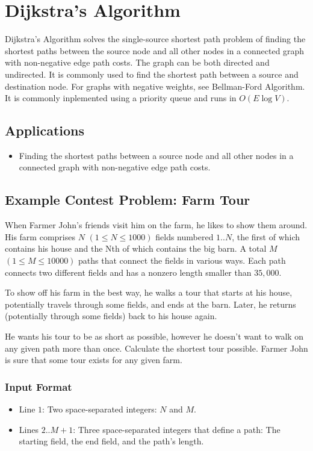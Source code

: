 \section{Dijkstra's Algorithm}
Dijkstra's Algorithm solves the single-source shortest path problem of finding the shortest paths between the source 
node and all other nodes in a connected graph with non-negative edge path costs.  
The graph can be both directed and undirected.  
It is commonly used to find the shortest path between a source and destination node.  
For graphs with negative weights, see Bellman-Ford Algorithm.
It is commonly inplemented using a priority queue and runs in $O(E \log V)$.

\subsection{Applications}

\begin{itemize}
	\item  Finding the shortest paths between a source node and all other nodes in a connected graph with non-negative edge path costs.
\end{itemize}

\subsection{Example Contest Problem: Farm Tour\cite{farmtour}}
When Farmer John's friends visit him on the farm, he likes to show them around. 
His farm comprises $N$ $(1 \leq N \leq 1000)$ fields numbered $1..N$, the first of which contains his house and the Nth of which contains the big barn. 
A total $M$ $(1 \leq M \leq 10000)$ paths that connect the fields in various ways. 
Each path connects two different fields and has a nonzero length smaller than $35,000$. 

To show off his farm in the best way, he walks a tour that starts at his house, potentially travels through some fields, and ends at the barn. 
Later, he returns (potentially through some fields) back to his house again. 

He wants his tour to be as short as possible, however he doesn't want to walk on any given path more than once. 
Calculate the shortest tour possible. 
Farmer John is sure that some tour exists for any given farm.

\subsubsection{Input Format}
\begin{itemize}
	\item Line $1$: Two space-separated integers: $N$ and $M$. 
	\item Lines $2..M+1$: Three space-separated integers that define a path: The starting field, the end field, and the path's length. 
\end{itemize}

